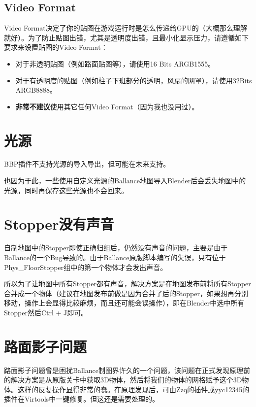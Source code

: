 \subsection{Video Format}

Video Format决定了你的贴图在游戏运行时是怎么传递给GPU的（大概那么理解就好）。为了防止贴图出错，尤其是透明度出错，且最小化显示压力，请遵循如下要求来设置贴图的Video Format：

\begin{itemize}

\item 对于非透明贴图（例如路面贴图等），请使用16 Bits ARGB1555。

\item 对于有透明度的贴图（例如柱子下班部分的透明，风扇的网罩），请使用32Bits ARGB8888。

\item \textbf{非常不建议}使用其它任何Video Format（因为我也没用过）。

\end{itemize}

\section{光源}

BBP插件不支持光源的导入导出，但可能在未来支持。

也因为于此，一些使用自定义光源的Ballance地图导入Blender后会丢失地图中的光源，同时再保存这些光源也不会回来。

\section{Stopper没有声音}

自制地图中的Stopper即使正确归组后，仍然没有声音的问题，主要是由于Ballance的一个Bug导致的。由于Ballance原版脚本编写的失误，只有位于Phys\_FloorStopper组中的第一个物体才会发出声音。

所以为了让地图中所有Stopper都有声音，解决方案是在地图发布前将所有Stopper合并成一个物体（建议在地图发布前做是因为合并了后的Stopper，如果想再分别移动，操作上会显得比较麻烦，而且还可能会误操作），即在Blender中选中所有Stopper然后Ctrl + J即可。

\section{路面影子问题}

路面影子问题曾是困扰Ballance制图界许久的一个问题，该问题在正式发现原理前的解决方案是从原版关卡中获取3D物体，然后将我们的物体的网格赋予这个3D物体。这样的反复操作显得非常的蠢。在原理发现后，可由Zzq的插件或yyc12345的插件在Virtools中一键修复。但这还是需要处理的。

